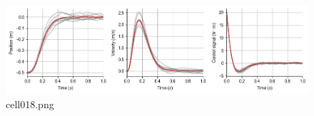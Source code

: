 \begin{figure}[ht]
	\centering
	\includegraphics[scale=0.8, max width=\linewidth]{./fig/motor-learning/infinite-horizon-ofc/cell018.png}
	\caption{cell018.png}
	\label{cell018.png}
\end{figure}
